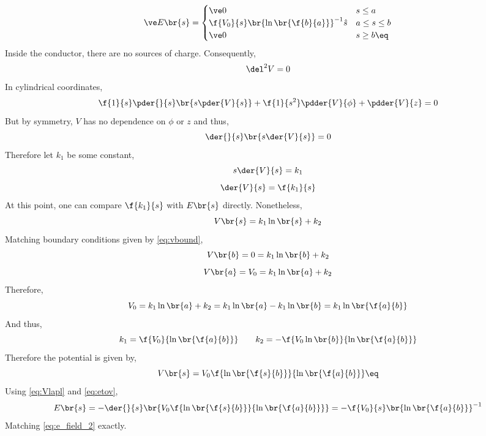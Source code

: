 \documentclass{article}
\begin{document}
\[ \ve E \br{s} = \begin{cases}
    \ve 0 & s \leq a \\
    \f{V_0}{s} \br{\ln\br{\f{b}{a}}}^{-1}\hat{s} & a \leq s \leq b \\
    \ve 0 & s \geq b \eq \label{eq:e_field_2}
\end{cases} \]
Inside the conductor, there are no sources of charge. Consequently,
\[ \del^2 V = 0 \]
In cylindrical coordinates,
\[ \f{1}{s}\pder{}{s}\br{s \pder{V}{s}} + \f{1}{s^2} \pdder{V}{\phi} + \pdder{V}{z} = 0 \]
But by symmetry, $V$ has no dependence on $\phi$ or $z$ and thus,
\[ \der{}{s}\br{s \der{V}{s}} = 0 \]
Therefore let $k_1$ be some constant,
\[ s \der{V}{s} = k_1 \]
\[ \der{V}{s} = \f{k_1}{s} \]
At this point, one can compare $\f{k_1}{s}$ with $E\br{s}$ directly. Nonetheless,
\[ V\br{s} = k_1 \ln \br{s} + k_2 \]
Matching boundary conditions given by \cref{eq:vbound},
\[ V\br{b} = 0 = k_1 \ln \br{b} + k_2 \]
\[ V\br{a} = V_0 = k_1 \ln \br{a} + k_2 \]
Therefore,
\[ V_0 = k_1 \ln \br{a} + k_2 = k_1 \ln \br{a} - k_1 \ln \br{b} = k_1 \ln \br{\f{a}{b}} \]
And thus,
\[ k_1 = \f{V_0}{\ln \br{\f{a}{b}}} \qquad k_2 = - \f{V_0 \ln \br{b}}{\ln \br{\f{a}{b}}}  \]
Therefore the potential is given by,
\[ V\br{s} = V_0\f{\ln\br{\f{s}{b}}}{\ln \br{\f{a}{b}}} \eq \label{eq:Vlapl}\]
Using \cref{eq:Vlapl} and \cref{eq:etov},
\[ E\br{s} = - \der{}{s} \br{V_0\f{\ln\br{\f{s}{b}}}{\ln \br{\f{a}{b}}}} = -\f{V_0}{s}\br{\ln\br{\f{a}{b}}}^{-1}\]
Matching \cref{eq:e_field_2} exactly.

\newcommand{\coord}[4]{\coordinate (#1) at (#2,#3,#4);}
\newcommand{\cylindcoord}[4]{\coordinate (#1) at ({#2*cos(#3)},{#2*sin(#3)},{#4});}
\newcommand{\spherecoord}[4]{\coordinate (#1) at ({#2*cos(#3)*sin(#4)},{#2*sin(#3)*sin(#4)},{#2*cos(#4)});}

\pgfmathsetmacro{}
\pgfmathsetmacro{}
\tdplotsetmaincoords{\th}{\az}
\end{document}
